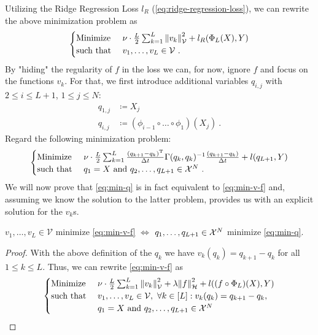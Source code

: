 Utilizing the Ridge Regression Loss $l_R$ (\autoref{eq:ridge-regression-loss}), we can rewrite the above minimization problem as
\begin{equation}
	\begin{cases}
		\text{Minimize~} & \nu \cdot \frac{L}{2} \sum_{k=1}^{L} \norm{v_k}_\mathcal{V}^2
		+ l_R(\Phi_L(X), Y) \\
		\text{such that~} & v_1, \ldots, v_L \in \mathcal{V}\ .
	\end{cases}
\end{equation}
By "hiding" the regularity of $f$ in the loss we can, for now, ignore $f$ and focus on the functions $v_k$.
For that, we first introduce additional variables $q_{i,j}$ with $2 \leq i \leq L+1$, $1 \leq j \leq N$:
\begin{align}
	q_{1, j} &\coloneqq X_j \, \\
	q_{i, j} &\coloneqq (\phi_{i-1} \circ \ldots \circ \phi_1) (X_j) \ .
\end{align}
Regard the following minimization problem:
\begin{equation}
	\label{eq:min-q}
	\begin{cases}
	\text{Minimize~} & \nu \cdot \frac{L}{2} \sum_{k=1}^{L} \frac{(q_{k+1} - q_k)^\mathrm{T}}{\Delta t} \Gamma(q_k, q_k)^{-1} \frac{(q_{k+1} - q_k)}{\Delta t} + l(q_{L+1}, Y) \\
	\text{such that~} & q_1 = X \text{~and~} q_2, \ldots, q_{L+1} \in \mathcal{X}^N \ .
	\end{cases}
\end{equation}
We will now prove that \autoref{eq:min-q} is in fact equivalent to \autoref{eq:min-v-f} and, assuming we know the solution to the latter problem, provides us with an explicit solution for the $v_k$s.

\begin{theorem}
	$v_1, \ldots, v_L \in \mathcal{V}$ minimize \autoref{eq:min-v-f} 
	$\Leftrightarrow$
	$q_1, \ldots, q_{L+1} \in \mathcal{X}^N$ minimize \autoref{eq:min-q}.
\end{theorem}
\begin{proof}
	With the above definition of the $q_k$ we have $v_k(q_k) = q_{k+1} - q_k$ for all $1 \leq k \leq L$.
	Thus, we can rewrite \autoref{eq:min-v-f} as
	\begin{equation}
		\label{eq:min-q-v}
		\begin{cases}
		\text{Minimize~} & \nu \cdot \frac{L}{2} \sum_{k=1}^{L} \norm{v_k}_\mathcal{V}^2
		+ \lambda \norm{f}_\mathcal{H}^2 
		+ l((f \circ \Phi_L)(X), Y) \\
		\text{such that~} & v_1, \ldots, v_L \in \mathcal{V},\ \forall k \in [L]: v_k(q_k) = q_{k+1} - q_k, \\
		& q_1 = X \text{~and~} q_2, \ldots, q_{L+1} \in \cX^N \\
		\end{cases}
	\end{equation}
	
\end{proof}

